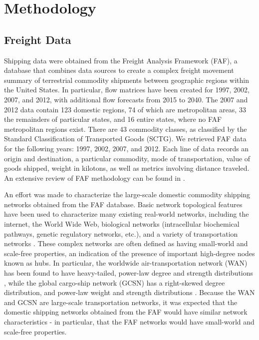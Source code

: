 \documentclass[12pt]{article}
\begin{document}
\section*{Methodology}

\subsection*{Freight Data}


Shipping data were obtained from the Freight Analysis Framework (FAF), a database that combines data sources to create a complex freight movement summary of terrestrial commodity shipments between geographic regions within the United States. In particular, flow matrices have been created for 1997, 2002, 2007, and 2012, with additional flow forecasts from 2015 to 2040.  The 2007 and 2012 data contain 123 domestic regions, 74 of which are metropolitan areas, 33 the remainders of particular states, and 16 entire states, where no FAF metropolitan regions exist.  There are 43 commodity classes, as classified by the Standard Classification of Transported Goods (SCTG).  We retrieved FAF data for the following years: 1997, 2002, 2007, and 2012. Each line of data records an origin and destination, a particular commodity, mode of transportation, value of goods shipped, weight in kilotons, as well as metrics involving distance traveled. An extensive review of FAF methodology can be found in \citet{FAF3manual}.


An effort was made to characterize the large-scale domestic commodity shipping networks obtained from the FAF database.  Basic network topological features have been used to characterize many existing real-world networks, including the internet, the World Wide Web, biological networks (intracellular biochemical pathways, genetic regulatory networks, etc.), and a variety of transportation networks \citep{Barrat2008}.  These complex networks are often defined as having small-world and scale-free properties, an indication of the presence of important high-degree nodes known as hubs.  In particular, the worldwide air-transportation network (WAN) has been found to have heavy-tailed, power-law degree and strength distributions \citep{Barrat2004, Guimera2004}, while the global cargo-ship network (GCSN) has a right-skewed degree distribution, and power-law weight and strength distributions \citep{Kaluza2009}.  Because the WAN and GCSN are large-scale transportation networks, it was expected that the domestic shipping networks obtained from the FAF would have similar network characteristics - in particular, that the FAF networks would have small-world and scale-free properties.
\end{document}
